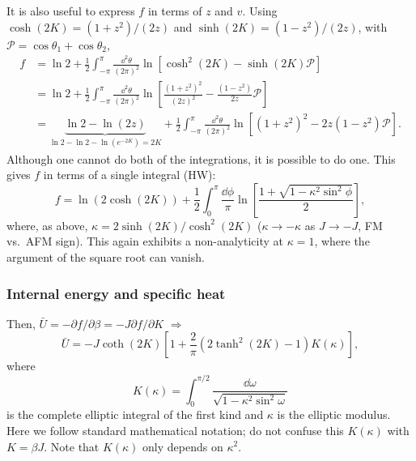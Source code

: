 It is also useful to express $f$ in terms of $z$ and $v$. Using $\cosh(2K) = (1+z^2)/(2z)$ and
$\sinh(2K) = (1-z^2)/(2z)$, with $\mathcal P = \cos\theta_1+\cos\theta_2$,
\begin{align}
  f &= \ln 2 + \frac{1}{2}\int_{-\pi}^{\pi}\frac{\dd^2\theta}{(2\pi)^2}\ln\left[\cosh^2(2K)-\sinh(2K)\mathcal P\right]\nonumber\\
    &= \ln 2 + \frac{1}{2}\int_{-\pi}^{\pi}\frac{\dd^2\theta}{(2\pi)^2}\ln\left[\frac{(1+z^2)^2}{(2z)^2}-\frac{(1-z^2)}{2z}\mathcal P\right]\nonumber\\
    &= \underbrace{\ln 2 - \ln(2z)}_{\ln 2-\ln 2-\ln(e^{-2K}) = 2K}
     + \frac{1}{2}\int_{-\pi}^{\pi}\frac{\dd^2\theta}{(2\pi)^2}\ln\left[(1+z^2)^2 - 2z(1-z^2)\mathcal P\right].
\end{align}
Although one cannot do both of the integrations, it is possible to do one. This gives $f$ in terms of a
single integral (HW):
\begin{equation}
  f = \ln\left(2\cosh(2K)\right) + \frac{1}{2}\int_0^\pi\frac{\dd\phi}{\pi}
      \ln\left[\frac{1+\sqrt{1-\kappa^2\sin^2\phi}}{2}\right],
\end{equation}
where, as above, $\kappa = 2\sinh(2K)/\cosh^2(2K)$ ($\kappa\to-\kappa$ as $J\to-J$, FM vs.\ AFM sign). This again exhibits a non-analyticity at
$\kappa = 1$, where the argument of the square root can vanish.

\subsubsection*{Internal energy and specific heat}

Then, $\bar U = -\partial f/\partial \beta = -J\partial f/\partial K$ $\Rightarrow$
\begin{equation}
  \bar U = -J\coth(2K)\left[1 + \frac{2}{\pi}\left(2\tanh^2(2K)-1\right)K(\kappa)\right],
\end{equation}
where
\begin{equation}
  K(\kappa) = \int_0^{\pi/2}\frac{\dd\omega}{\sqrt{1-\kappa^2\sin^2\omega}}
\end{equation}
is the complete elliptic integral of the first kind and $\kappa$ is the elliptic modulus. Here we follow
standard mathematical notation; do not confuse this $K(\kappa)$ with $K = \beta J$. Note that $K(\kappa)$
only depends on $\kappa^2$.

